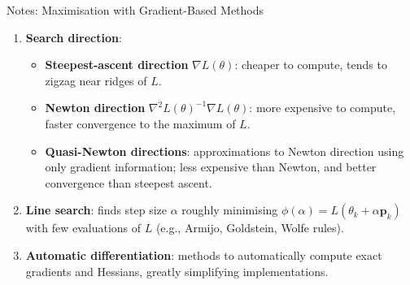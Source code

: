 \begin{frame}{Notes: Maximisation with Gradient-Based Methods}
    \begin{enumerate}
        \item \textbf{Search direction}:
            \begin{itemize}
                \item \textbf{Steepest-ascent direction} $\nabla L(\theta)$: cheaper to compute, tends to zigzag near ridges of $L$.
                \item \textbf{Newton direction} $\nabla^2L(\theta)^{-1}\nabla L(\theta)$: more expensive to compute, faster convergence to the maximum of $L$.
                \item \textbf{Quasi-Newton directions}: approximations to Newton direction using only gradient information; less expensive than Newton, and better convergence than steepest ascent.
            \end{itemize}
            
        \item \textbf{Line search}: finds step size $\alpha$ roughly minimising $\phi(\alpha)=L(\theta_k+\alpha\mathbf{p}_k)$ with few evaluations of $L$ (e.g., Armijo, Goldstein, Wolfe rules).
        
        \item \textbf{Automatic differentiation}: methods to automatically compute exact gradients and Hessians, greatly simplifying implementations.
    \end{enumerate}

    \vfill
    \hfill\tiny\citet{nocedalAndWright06}
\end{frame}

